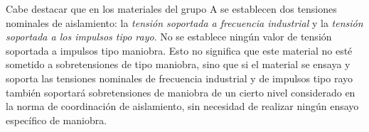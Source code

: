             Cabe destacar que en los materiales del grupo A se establecen dos tensiones nominales de aislamiento: la \textit{tensión soportada a frecuencia industrial} y la \textit{tensión soportada a los impulsos tipo rayo}. No se establece ningún valor de tensión soportada a impulsos tipo maniobra. Esto no significa que este material no esté sometido a sobretensiones de tipo maniobra, sino que si el material se ensaya y soporta las tensiones nominales de frecuencia industrial y de impulsos tipo rayo también soportará sobretensiones de maniobra de un cierto nivel considerado en la norma de coordinación de aislamiento, sin necesidad de realizar ningún ensayo específico de maniobra.\newline 

            \begin{table}[H]
                \centering
                \renewcommand{\arraystretch}{1.1}
\end{table}
